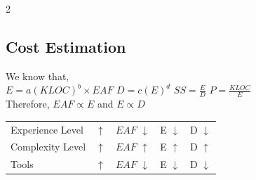 \begin{multicols}{2}
\vspace{4em}
\subsection*{Cost Estimation}
We know that,\\
$E = a(KLOC)^{b} \times EAF$ \quad
$D = c(E)^{d}$ \quad $SS = \frac{E}{D}$ \quad $P = \frac{KLOC}{E}$ \\
Therefore, $EAF \propto E$ 
and $E \propto D$

\begin{tabular}{lllll}
   Experience Level &$\uparrow$ & $EAF$ $\downarrow$
   & E $\downarrow$ & D $\downarrow$\\
   Complexity Level &$\uparrow$ & $EAF$ $\uparrow$
   & E $\uparrow$ & D $\uparrow$\\
   Tools &$\uparrow$ & $EAF$ $\downarrow$
   & E $\downarrow$ & D $\downarrow$
\end{tabular}

   
   
   
\end{multicols}
